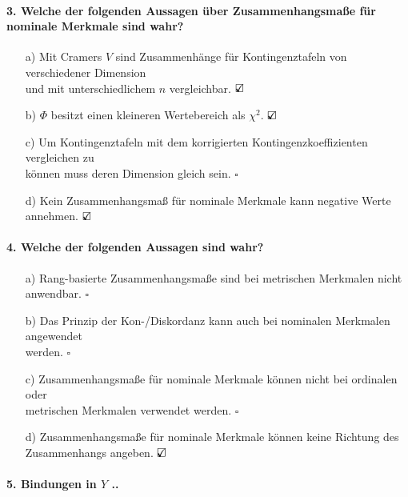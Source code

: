\documentclass[a4paper]{article}
\begin{document}
\paragraph{3. Welche der folgenden Aussagen über Zusammenhangsmaße für nominale Merkmale sind wahr?}

\begin{itemize}
    \item[a)] Mit Cramers $V$ sind Zusammenhänge für Kontingenztafeln von verschiedener Dimension\\und mit unterschiedlichem $n$ vergleichbar. \hfill $\text{\rlap{$\checkmark$}}\square$
    \item[b)] $\Phi$ besitzt einen kleineren Wertebereich als $\chi^2$. \hfill $\text{\rlap{$\checkmark$}}\square$
    \item[c)] Um Kontingenztafeln mit dem korrigierten Kontingenzkoeffizienten vergleichen zu\\können muss deren Dimension gleich sein. \hfill $\square$
    \item[d)] Kein Zusammenhangsmaß für nominale Merkmale kann negative Werte annehmen. \hfill $\text{\rlap{$\checkmark$}}\square$
\end{itemize}

\paragraph{4. Welche der folgenden Aussagen sind wahr?}

\begin{itemize}
    \item[a)] Rang-basierte Zusammenhangsmaße sind bei metrischen Merkmalen nicht anwendbar. \hfill $\square$
    \item[b)] Das Prinzip der Kon-/Diskordanz kann auch bei nominalen Merkmalen angewendet\\werden. \hfill $\square$
    \item[c)] Zusammenhangsmaße für nominale Merkmale können nicht bei ordinalen oder\\metrischen Merkmalen verwendet werden. \hfill $\square$
    \item[d)] Zusammenhangsmaße für nominale Merkmale können keine Richtung des\\Zusammenhangs angeben. \hfill $\text{\rlap{$\checkmark$}}\square$
\end{itemize}

\paragraph{5. Bindungen in $Y$ ..}
\end{document}
